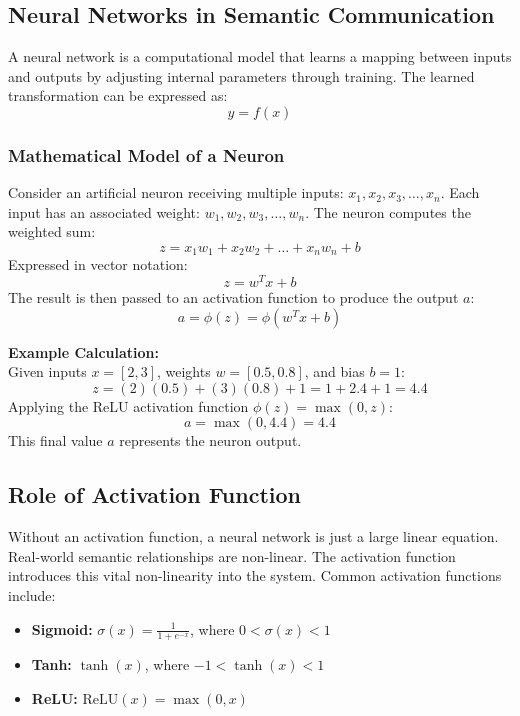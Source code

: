 \documentclass[10pt, conference]{IEEEtran}
\begin{document}
\subsection{\textbf{Neural Networks in Semantic Communication}}
A neural network is a computational model that learns a mapping between inputs and outputs by adjusting internal parameters through training. The learned transformation can be expressed as:
\begin{equation}
    y = f(x)
\end{equation}

\subsubsection{\textbf{Mathematical Model of a Neuron}}
Consider an artificial neuron receiving multiple inputs: $x_1, x_2, x_3, \dots, x_n$. Each input has an associated weight: $w_1, w_2, w_3, \dots, w_n$.
The neuron computes the weighted sum:
\begin{equation}
    z = x_1w_1 + x_2w_2 + \dots + x_nw_n + b
\end{equation}
Expressed in vector notation:
\begin{equation}
    z = w^T x + b
\end{equation}
The result is then passed to an activation function to produce the output $a$:
\begin{equation}
    a = \phi(z) = \phi(w^T x + b)
\end{equation}

\textbf{Example Calculation:}\\
Given inputs $x = [2, 3]$, weights $w = [0.5, 0.8]$, and bias $b = 1$:
\begin{equation}
    z = (2)(0.5) + (3)(0.8) + 1 = 1 + 2.4 + 1 = 4.4
\end{equation}
Applying the ReLU activation function $\phi(z) = \max(0, z)$:
\begin{equation}
    a = \max(0, 4.4) = 4.4
\end{equation}
This final value $a$ represents the neuron output.

\subsection{\textbf{Role of Activation Function}}
Without an activation function, a neural network is just a large linear equation. Real-world semantic relationships are non-linear. The activation function introduces this vital non-linearity into the system. Common activation functions include:
\begin{itemize}
    \item \textbf{Sigmoid:} $\sigma(x) = \frac{1}{1 + e^{-x}}$, where $0 < \sigma(x) < 1$
    \item \textbf{Tanh:} $\tanh(x)$, where $-1 < \tanh(x) < 1$
    \item \textbf{ReLU:} $\text{ReLU}(x) = \max(0, x)$
\end{itemize}
\end{document}

